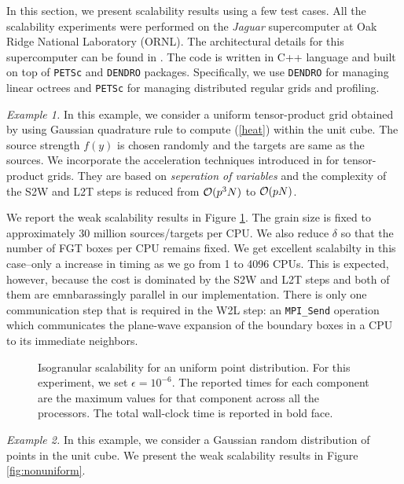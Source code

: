 In this section, we present scalability results using a few test cases.  All the scalability experiments were performed 
on the {\it{Jaguar}} supercomputer at Oak Ridge National Laboratory (ORNL). The architectural details for this supercomputer
 can be found in \cite{jaguar}. The code is written in C++ language and built on top of \texttt{PETSc} and \texttt{DENDRO} packages. 
 Specifically, we use \texttt{DENDRO} for managing linear octrees and \texttt{PETSc} for managing distributed regular grids and profiling. 


{\em Example 1.} In this example, we consider a uniform tensor-product grid obtained by using Gaussian quadrature rule to compute (\ref{heat}) within the unit cube. The source strength $f(y)$ is chosen randomly and the targets are same as the sources. We incorporate the acceleration techniques introduced in \cite{fggt} for tensor-product grids. They are based on 
{\em seperation of variables} and the complexity of the S2W and L2T steps is reduced from $\mathcal{O}(p^3 N)$ to $\mathcal{O}(p N)$. 

We report the weak scalability results in Figure \ref{fig:uniform}. The grain size is fixed to approximately 30 million sources/targets per CPU. We also reduce $\delta$ so that the number of FGT boxes per CPU remains fixed. We get excellent scalabilty in this case--only a  increase in timing as we go from 1 to 4096 CPUs. This is expected, however, because the cost is dominated by the S2W and L2T steps and both of them are emnbarassingly parallel in our implementation. There is only one communication step that is required in the W2L step: an \texttt{MPI\_Send} operation which communicates the plane-wave expansion of the boundary boxes in a CPU to its immediate neighbors. 

\begin{figure}
	\begin{center}
	
	\end{center}
\caption{\label{f:isoUniform} Isogranular scalability for an uniform point distribution. For
 this experiment, we set $\epsilon = 10^{-6}$. The reported times for 
each component are the maximum values for that component across all the processors. The total wall-clock
time is reported in bold face.} \label{fig:uniform}
\end{figure}

{\em Example 2.} In this example, we consider a Gaussian random distribution of points in the unit cube. 
We present the weak scalability results in Figure \ref{fig:nonuniform}. 

